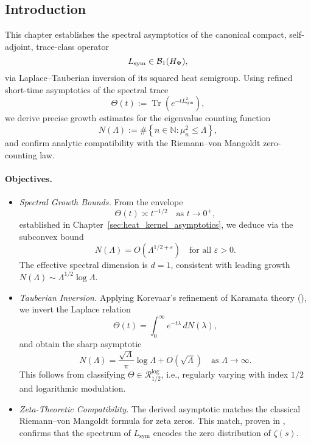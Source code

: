 \subsection*{Introduction}

This chapter establishes the spectral asymptotics of the canonical compact, self-adjoint, trace-class operator
\[
L_{\mathrm{sym}} \in \mathcal{B}_1(H_{\Psi}),
\]
via Laplace–Tauberian inversion of its squared heat semigroup. Using refined short-time asymptotics of the spectral trace
\[
\Theta(t) := \operatorname{Tr}(e^{-t L_{\mathrm{sym}}^2}),
\]
we derive precise growth estimates for the eigenvalue counting function
\[
N(\Lambda) := \#\left\{ n \in \mathbb{N} : \mu_n^2 \le \Lambda \right\},
\]
and confirm analytic compatibility with the Riemann–von Mangoldt zero-counting law.

\paragraph{Objectives.}
\begin{itemize}
  \item \textit{Spectral Growth Bounds.}  
  From the envelope
  \[
  \Theta(t) \asymp t^{-1/2} \quad \text{as } t \to 0^+,
  \]
  established in Chapter~\ref{sec:heat_kernel_asymptotics}, we deduce via  the subconvex bound
  \[
  N(\Lambda) = O(\Lambda^{1/2+\varepsilon}) \quad \text{for all } \varepsilon > 0.
  \]
  The effective spectral dimension is \( d = 1 \), consistent with leading growth \( N(\Lambda) \sim \Lambda^{1/2} \log \Lambda \).

  \item \textit{Tauberian Inversion.}  
  Applying Korevaar’s refinement of Karamata theory (), we invert the Laplace relation
  \[
  \Theta(t) = \int_0^\infty e^{-t\lambda} \, dN(\lambda),
  \]
  and obtain the sharp asymptotic
  \[
  N(\Lambda) = \frac{\sqrt{\Lambda}}{\pi} \log \Lambda + O(\sqrt{\Lambda}) \quad \text{as } \Lambda \to \infty.
  \]
  This follows from classifying \( \Theta \in \mathcal{R}_{1/2}^{\log} \), i.e., regularly varying with index \( 1/2 \) and logarithmic modulation.

  \item \textit{Zeta-Theoretic Compatibility.}  
  The derived asymptotic matches the classical Riemann–von Mangoldt formula for zeta zeros. This match, proven in , confirms that the spectrum of \( L_{\mathrm{sym}} \) encodes the zero distribution of \( \zeta(s) \).
\end{itemize}

